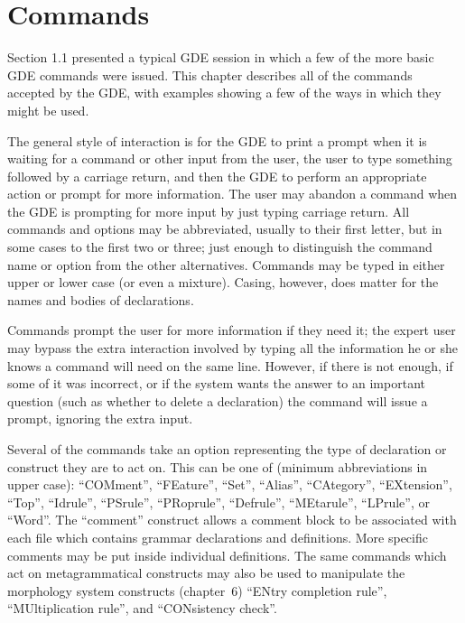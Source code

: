 \chapter{Commands}

Section 1.1 presented a typical GDE session in which a few of the more
basic GDE commands were issued. This chapter describes all of the
commands accepted by the GDE, with examples showing a few of the ways in
which they might be used.

The general style of interaction is for the GDE to print a prompt when
it is waiting for a command or other input from the user, the user to
type something followed by a carriage return, and then the GDE to
perform an appropriate action or prompt for more information. The user
may abandon a command when the GDE is prompting for more input by
just typing carriage return. All commands and options may be abbreviated,
usually to their first letter, but in some cases to the first two or
three; just enough to distinguish the command name or option from
the other alternatives. Commands may be typed in either upper or lower
case (or even a mixture). Casing, however, does matter for the names
and bodies of declarations.

Commands prompt the user for more information if they need it; the
expert user may bypass the extra interaction involved by typing all the
information he or she knows a command will need on the same line.
However, if there is not enough, if some of it was incorrect, or if the
system wants the answer to an important question (such as whether to
delete a declaration) the command will issue a prompt, ignoring the
extra input.

Several of the commands take an option representing the type of
declaration or construct they are to act on. This can be one of (minimum
abbreviations in upper case): ``COMment'', ``FEature'', ``Set'',
``Alias'', ``CAtegory'', ``EXtension'', ``Top'',
``Idrule'', ``PSrule'', ``PRoprule'', ``Defrule'', ``MEtarule'',
``LPrule'', or ``Word''. The ``comment'' construct allows a comment
block to be associated with each file which contains grammar
declarations and definitions. More specific comments may be put inside
individual definitions. The same commands which act on metagrammatical
constructs may also be used to manipulate the morphology system
constructs (chapter~6) ``ENtry completion rule'', ``MUltiplication rule'',
and ``CONsistency check''. 

